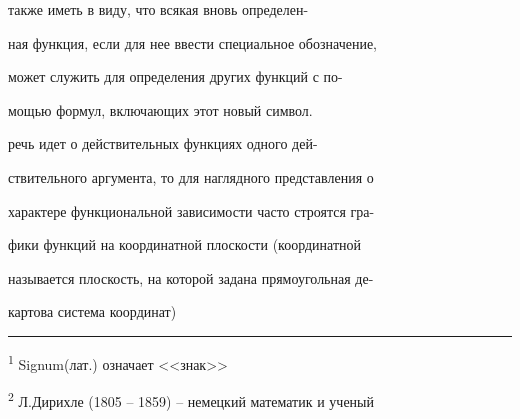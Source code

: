 \documentclass[12pt, a4paper]{article}
\begin{document}
 также иметь в виду, что всякая вновь определен-

ная функция, если для нее ввести специальное обозначение,

может служить для определения других функций с по-

мощью формул, включающих этот новый символ.

 речь идет о действительных функциях одного дей-

ствительного аргумента, то для наглядного представления о

характере функциональной зависимости часто строятся гра-

фики функций на координатной плоскости (координатной

называется плоскость, на которой задана прямоугольная де-

картова система координат)

\rule{2cm}{0.4pt}

\textsuperscript{1} Signum(лат.) означает <<знак>>

\textsuperscript{2} Л.Дирихле (1805 -- 1859) -- немецкий математик и ученый
\end{document}
